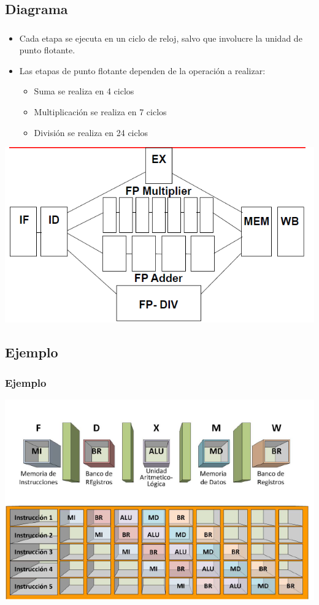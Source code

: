 \documentclass{beamer}
\begin{document}
\subsection{Diagrama}
\begin{frame}
\frametitle{}
\begin{itemize}
\item Cada etapa se ejecuta en un ciclo de reloj, salvo que involucre la unidad de punto flotante.
\item Las etapas de punto flotante dependen de la operación a realizar:
\begin{itemize}
\item Suma se realiza en 4 ciclos
\item Multiplicación se realiza en 7 ciclos
\item División se realiza en 24 ciclos
\end{itemize}
\end{itemize}
\includegraphics[scale=0.45]{ciclo-instruccion.png}
\end{frame}

\subsection{Ejemplo}
\begin{frame}
\frametitle{Ejemplo}
\includegraphics[scale=0.45]{ejemplo-segmentacion.png}
\end{frame}
\end{document}
